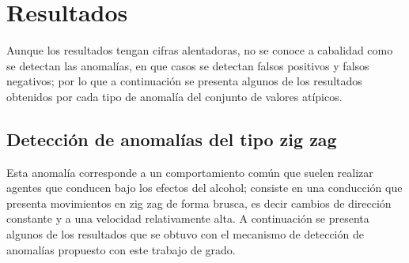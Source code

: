 
\section{Resultados}

Aunque los resultados tengan cifras alentadoras, no se conoce a cabalidad como se detectan las anomal\'{i}as, en que casos se detectan falsos positivos y falsos negativos; por lo que a continuaci\'{o}n se presenta algunos de los resultados obtenidos por cada tipo de anomal\'{i}a del conjunto de valores at\'{i}picos. 

\subsection{Detecci\'{o}n de anomal\'{i}as del tipo zig zag}

Esta anomal\'{i}a corresponde a un comportamiento com\'{u}n que suelen realizar agentes que conducen bajo los efectos del alcohol; consiste en una conducci\'{o}n que presenta movimientos en zig zag de forma brusca, es decir cambios de direcci\'{o}n constante y a una velocidad relativamente alta. A continuaci\'{o}n se presenta algunos de los resultados que se obtuvo con el mecanismo de detecci\'{o}n de anomal\'{i}as propuesto con este trabajo de grado.


